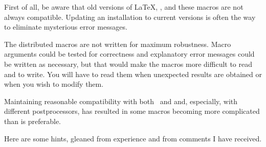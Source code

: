 First of all, be aware that old versions of \LaTeX, \dpic, and these
macros are not always compatible.  Updating an installation to current
versions is often the way to eliminate mysterious error messages.

The distributed macros are not written for maximum robustness.
Macro arguments could be tested for correctness and
explanatory error messages could be written as necessary, but that
would make the macros more difficult to read and to write.  You will
have to read them when unexpected results are obtained or when you wish
to modify them.

Maintaining reasonable compatibility with both \gpic\ and \dpic
and, especially, with different postprocessors, has
resulted in some macros becoming more complicated than is preferable.

Here are some hints, gleaned from experience and from comments I have
received.
\newcommand{%
 \bflistitem}[2]{\phantomsection\pdfbookmark[subsection]{#1}{#2}{\bf #1: }}
